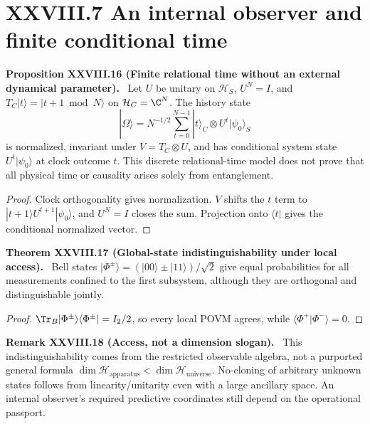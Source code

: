 \documentclass[11pt,a4paper,oneside]{book}
\newcommand{\statement}[3]{\par\medskip\noindent\textbf{#1 #2 (#3).}\ }
\begin{document}
\section*{XXVIII.7 An internal observer and finite conditional time}
\statement{Proposition}{XXVIII.16}{Finite relational time without an external dynamical parameter} Let $U$ be unitary on $\mathcal H_S$, $U^N=I$, and $T_C|t\rangle=|t+1\bmod N\rangle$ on $\mathcal H_C=\C^N$. The history state
\[|\Omega\rangle=N^{-1/2}\sum_{t=0}^{N-1}|t\rangle_C\otimes U^t|\psi_0\rangle_S\]
is normalized, invariant under $V=T_C\otimes U$, and has conditional system state $U^t|\psi_0\rangle$ at clock outcome $t$. This discrete relational-time model does not prove that all physical time or causality arises solely from entanglement.
\begin{proof}Clock orthogonality gives normalization. $V$ shifts the $t$ term to $|t+1\rangle U^{t+1}|\psi_0\rangle$, and $U^N=I$ closes the sum. Projection onto $\langle t|$ gives the conditional normalized vector.\end{proof}
\statement{Theorem}{XXVIII.17}{Global-state indistinguishability under local access} Bell states $|\Phi^\pm\rangle=(|00\rangle\pm|11\rangle)/\sqrt2$ give equal probabilities for all measurements confined to the first subsystem, although they are orthogonal and distinguishable jointly.
\begin{proof}$\Tr_B|\Phi^\pm\rangle\langle\Phi^\pm|=I_2/2$, so every local POVM agrees, while $\langle\Phi^+|\Phi^-\rangle=0$.\end{proof}
\statement{Remark}{XXVIII.18}{Access, not a dimension slogan} This indistinguishability comes from the restricted observable algebra, not a purported general formula $\dim\mathcal H_{\mathrm{apparatus}}<\dim\mathcal H_{\mathrm{universe}}$. No-cloning of arbitrary unknown states follows from linearity/unitarity even with a large ancillary space. An internal observer's required predictive coordinates still depend on the operational passport.
\end{document}
